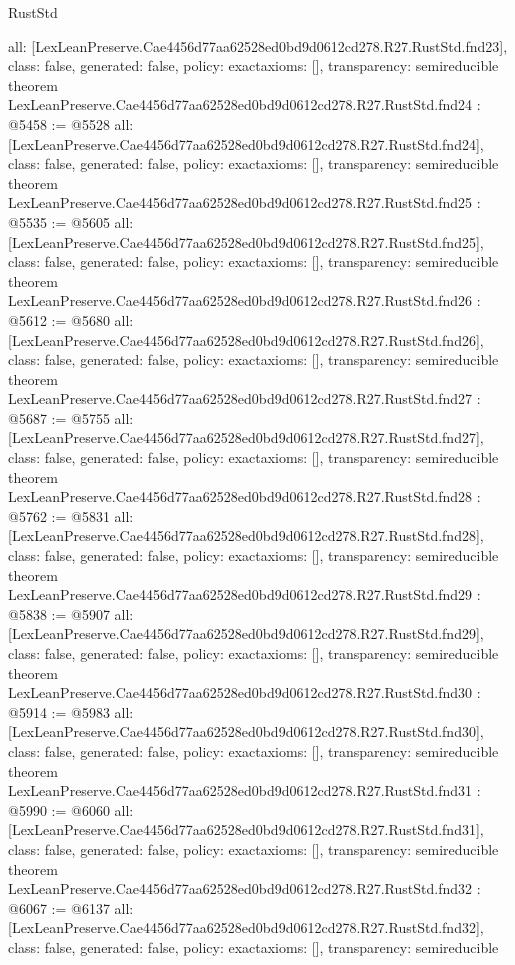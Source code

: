 \begin{lexlean}{RustStd}
\begin{coremodule}
{  all: [LexLeanPreserve.Cae4456d77aa62528ed0bd9d0612cd278.R27.RustStd.fnd23],
  class: false,
  generated: false,
  policy: exact{axioms: []},
  transparency: semireducible
}
theorem LexLeanPreserve.Cae4456d77aa62528ed0bd9d0612cd278.R27.RustStd.fnd24 : @5458 := @5528 {
  all: [LexLeanPreserve.Cae4456d77aa62528ed0bd9d0612cd278.R27.RustStd.fnd24],
  class: false,
  generated: false,
  policy: exact{axioms: []},
  transparency: semireducible
}
theorem LexLeanPreserve.Cae4456d77aa62528ed0bd9d0612cd278.R27.RustStd.fnd25 : @5535 := @5605 {
  all: [LexLeanPreserve.Cae4456d77aa62528ed0bd9d0612cd278.R27.RustStd.fnd25],
  class: false,
  generated: false,
  policy: exact{axioms: []},
  transparency: semireducible
}
theorem LexLeanPreserve.Cae4456d77aa62528ed0bd9d0612cd278.R27.RustStd.fnd26 : @5612 := @5680 {
  all: [LexLeanPreserve.Cae4456d77aa62528ed0bd9d0612cd278.R27.RustStd.fnd26],
  class: false,
  generated: false,
  policy: exact{axioms: []},
  transparency: semireducible
}
theorem LexLeanPreserve.Cae4456d77aa62528ed0bd9d0612cd278.R27.RustStd.fnd27 : @5687 := @5755 {
  all: [LexLeanPreserve.Cae4456d77aa62528ed0bd9d0612cd278.R27.RustStd.fnd27],
  class: false,
  generated: false,
  policy: exact{axioms: []},
  transparency: semireducible
}
theorem LexLeanPreserve.Cae4456d77aa62528ed0bd9d0612cd278.R27.RustStd.fnd28 : @5762 := @5831 {
  all: [LexLeanPreserve.Cae4456d77aa62528ed0bd9d0612cd278.R27.RustStd.fnd28],
  class: false,
  generated: false,
  policy: exact{axioms: []},
  transparency: semireducible
}
theorem LexLeanPreserve.Cae4456d77aa62528ed0bd9d0612cd278.R27.RustStd.fnd29 : @5838 := @5907 {
  all: [LexLeanPreserve.Cae4456d77aa62528ed0bd9d0612cd278.R27.RustStd.fnd29],
  class: false,
  generated: false,
  policy: exact{axioms: []},
  transparency: semireducible
}
theorem LexLeanPreserve.Cae4456d77aa62528ed0bd9d0612cd278.R27.RustStd.fnd30 : @5914 := @5983 {
  all: [LexLeanPreserve.Cae4456d77aa62528ed0bd9d0612cd278.R27.RustStd.fnd30],
  class: false,
  generated: false,
  policy: exact{axioms: []},
  transparency: semireducible
}
theorem LexLeanPreserve.Cae4456d77aa62528ed0bd9d0612cd278.R27.RustStd.fnd31 : @5990 := @6060 {
  all: [LexLeanPreserve.Cae4456d77aa62528ed0bd9d0612cd278.R27.RustStd.fnd31],
  class: false,
  generated: false,
  policy: exact{axioms: []},
  transparency: semireducible
}
theorem LexLeanPreserve.Cae4456d77aa62528ed0bd9d0612cd278.R27.RustStd.fnd32 : @6067 := @6137 {
  all: [LexLeanPreserve.Cae4456d77aa62528ed0bd9d0612cd278.R27.RustStd.fnd32],
  class: false,
  generated: false,
  policy: exact{axioms: []},
  transparency: semireducible
}
\end{coremodule}
\end{lexlean}
